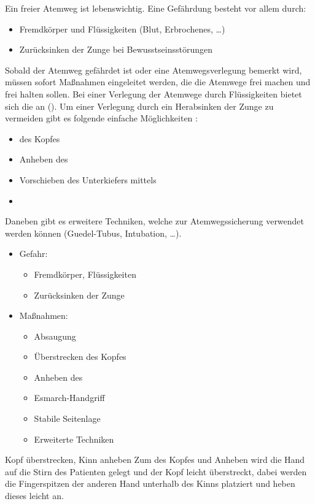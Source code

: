 \TextSlide{{\TxBeschreibung}}
{%
Ein freier Atemweg ist lebenswichtig. 
Eine Gefährdung besteht vor allem durch:
\begin{itemize}
  \item Fremdkörper und Flüssigkeiten (Blut, Erbrochenes, \ldots)
  \item Zurücksinken der Zunge bei Bewusstseinsstörungen
\end{itemize}
Sobald der Atemweg gefährdet ist oder 
eine Atemwegsverlegung bemerkt wird, müssen sofort
Maßnahmen eingeleitet werden, die die Atemwege 
frei machen und frei halten sollen. 
Bei einer Verlegung der Atemwege durch Flüssigkeiten 
bietet sich die  an ().
Um einer Verlegung durch ein Herabsinken der Zunge zu vermeiden gibt 
es folgende einfache Möglichkeiten \cite{Erc2010Sec4}:
\begin{itemize}
  \item {} des Kopfes 
  \item Anheben des 
  \item Vorschieben des Unterkiefers
  mittels 
  \item {}
\end{itemize}
Daneben gibt es erweitere Techniken, welche zur
Atemwegssicherung verwendet werden können (Guedel-Tubus, Intubation,
\ldots).
}
{%
\begin{itemize}
  \item Gefahr:
  \begin{itemize}
    \item Fremdkörper, Flüssigkeiten
    \item Zurücksinken der Zunge
  \end{itemize}
  \item Maßnahmen:
  \begin{itemize}
    \item Absaugung
    \item {Überstrecken} des Kopfes
    \item Anheben des 
    \item {Esmarch-Handgriff}
    \item {Stabile Seitenlage}
    \item Erweiterte Techniken
  \end{itemize}
\end{itemize}
}


\Text
{Kopf überstrecken, Kinn anheben}
{Zum  des Kopfes und Anheben wird die Hand
auf die Stirn des Patienten gelegt und der Kopf
leicht überstreckt, dabei werden die Fingerspitzen
der anderen Hand unterhalb des Kinns platziert und heben
dieses leicht an. \cite{Erc2010Sec4}}
{}
{}
{}
{}



